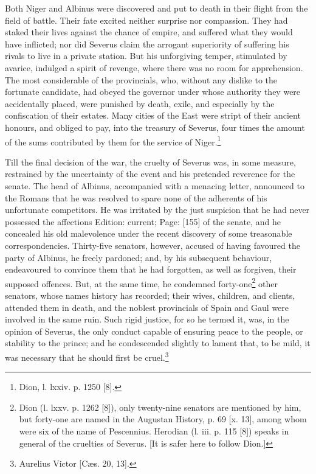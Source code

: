 Both Niger and Albinus were discovered and put to death in their flight from the field of battle. Their fate excited neither surprise nor compassion. They had staked their lives against the chance of empire, and suffered what they would have inflicted; nor did Severus claim the arrogant superiority of suffering his rivals to live in a private station. But his unforgiving temper, stimulated by avarice, indulged a spirit of revenge, where there was no room for apprehension. The most considerable of the provincials, who, without any dislike to the fortunate candidate, had obeyed the governor under whose authority they were accidentally placed, were punished by death, exile, and especially by the confiscation of their estates. Many cities of the East were stript of their ancient honours, and obliged to pay, into the treasury of Severus, four times the amount of the sums contributed by them for the service of Niger.\footnote{Dion, l. lxxiv. p. 1250 [8].}

Till the final decision of the war, the cruelty of Severus was, in some measure, restrained by the uncertainty of the event and his pretended reverence for the senate. The head of Albinus, accompanied with a menacing letter, announced to the Romans that he was resolved to spare none of the adherents of his unfortunate competitors. He was irritated by the just suspicion that he had never possessed the affections Edition: current; Page: [155] of the senate, and he concealed his old malevolence under the recent discovery of some treasonable correspondencies. Thirty-five senators, however, accused of having favoured the party of Albinus, he freely pardoned; and, by his subsequent behaviour, endeavoured to convince them that he had forgotten, as well as forgiven, their supposed offences. But, at the same time, he condemned forty-one\footnote{Dion (l. lxxv. p. 1262 [8]), only twenty-nine senators are mentioned by him, but forty-one are named in the Augustan History, p. 69 [x. 13], among whom were six of the name of Pescennius. Herodian (l. iii. p. 115 [8]) speaks in general of the cruelties of Severus. [It is safer here to follow Dion.]} other senators, whose names history has recorded; their wives, children, and clients, attended them in death, and the noblest provincials of Spain and Gaul were involved in the same ruin. Such rigid justice, for so he termed it, was, in the opinion of Severus, the only conduct capable of ensuring peace to the people, or stability to the prince; and he condescended slightly to lament that, to be mild, it was necessary that he should first be cruel.\footnote{Aurelius Victor [Cæs. 20, 13].}

